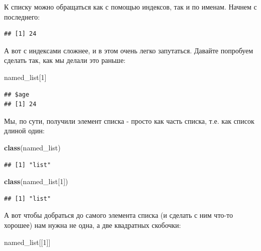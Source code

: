 \documentclass[
]{book}
\newenvironment{Shaded}{\begin{snugshade}}{\end{snugshade}}
\newcommand{\DecValTok}[1]{\textcolor[rgb]{0.00,0.00,0.81}{#1}}
\newcommand{\KeywordTok}[1]{\textcolor[rgb]{0.13,0.29,0.53}{\textbf{#1}}}
\newcommand{\NormalTok}[1]{#1}
\newcommand{\OperatorTok}[1]{\textcolor[rgb]{0.81,0.36,0.00}{\textbf{#1}}}
\begin{document}
К списку можно обращаться как с помощью индексов, так и по именам. Начнем с последнего:

\begin{Shaded}
\end{Shaded}

\begin{verbatim}
## [1] 24
\end{verbatim}

А вот с индексами сложнее, и в этом очень легко запутаться. Давайте попробуем сделать так, как мы делали это раньше:

\begin{Shaded}
\begin{Highlighting}[]
\NormalTok{named_list[}\DecValTok{1}\NormalTok{]}
\end{Highlighting}
\end{Shaded}

\begin{verbatim}
## $age
## [1] 24
\end{verbatim}

Мы, по сути, получили элемент списка - просто как часть списка, т.е. как список длиной один:

\begin{Shaded}
\begin{Highlighting}[]
\KeywordTok{class}\NormalTok{(named_list)}
\end{Highlighting}
\end{Shaded}

\begin{verbatim}
## [1] "list"
\end{verbatim}

\begin{Shaded}
\begin{Highlighting}[]
\KeywordTok{class}\NormalTok{(named_list[}\DecValTok{1}\NormalTok{])}
\end{Highlighting}
\end{Shaded}

\begin{verbatim}
## [1] "list"
\end{verbatim}

А вот чтобы добраться до самого элемента списка (и сделать с ним что-то хорошее) нам нужна не одна, а две квадратных скобочки:

\begin{Shaded}
\begin{Highlighting}[]
\NormalTok{named_list[[}\DecValTok{1}\NormalTok{]]}
\end{Highlighting}
\end{Shaded}
\end{document}
